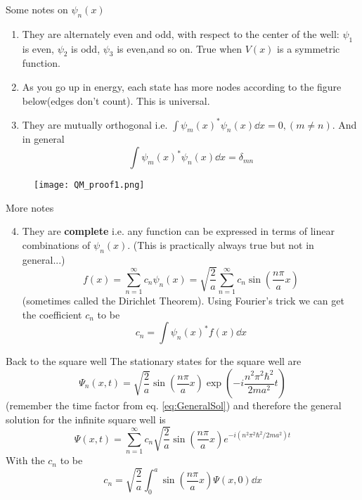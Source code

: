 \begin{frame}{Some notes on $\psi_n(x)$}
	\begin{enumerate}
		\item They are alternately even and odd, with respect to the center of the well: $\psi_1$ is even, $\psi_2$  is odd, $\psi_3$ is even,and so on. True when $V(x)$ is a symmetric function.
		\item As you go up in energy, each state has more nodes according to the figure below(edges don't count). This is universal.
		\item They are mutually orthogonal i.e. $\displaystyle \int \psi_m(x)^* \psi_n(x) \dd x = 0, (m \neq n)$. And in general $$\int \psi_m(x)^* \psi_n(x) \dd{x} = \delta_{mn}$$
	\end{enumerate}

	\begin{figure}
		\texttt{[image: QM\_proof1.png]}
	\end{figure}

\end{frame}

\begin{frame}{More notes}
	\begin{enumerate}
		\setcounter{enumi}{3}
		\item They are \textbf{complete} i.e. any function can be expressed in terms of linear combinations of $\psi_n(x)$. (This is practically always true but not in general...) $$ f(x) = \sum_{n=1}^{\infty} c_n \psi_n(x)	= \sqrt{\frac 2a } \sum_{n=1}^{\infty} c_n \sin(\frac{n\pi}{a} x)$$ (sometimes called the Dirichlet Theorem). Using Fourier's trick we can get the coefficient $c_n$ to be  $$ c_n = \int \psi_n(x)^* f(x) \dd{x} $$
	\end{enumerate}
\end{frame}

\begin{frame}{Back to the square well}
	The stationary states for the square well are
	\[
		\Psi_n(x,t) = \sqrt{\frac 2a} \sin(\frac{n\pi}{a}x) \exp(-i \frac{n^2\pi^2 \hbar^2}{2ma^2}t)
	\]
	(remember the time factor from eq. \ref{eq:GeneralSol}) and therefore the general solution for the infinite square well is
	\begin{equation}
		\label{eq:sol_sqwell}
		\Psi(x,t) = \sum_{n=1}^{\infty}c_n \sqrt{\frac 2a} \sin(\frac{n\pi}{a}x)e^{-i (n^2\pi^2 \hbar^2/2ma^2)t}
	\end{equation}
	With the $c_n$ to be
	\begin{equation}
		c_n = \sqrt{\frac 2a} \int_{0}^{a} \sin(\frac{n\pi}{a}x) \Psi(x,0) \dd{x}
	\end{equation}

\end{frame}


